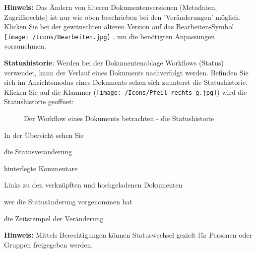 \vspace{\baselineskip}

\textbf{Hinweis:} Das Ändern von älteren Dokumentenversionen (Metadaten, Zugriffsrechte) ist nur wie oben beschrieben bei den 'Veränderungen' möglich. Klicken Sie bei der gewünschten älteren Version auf das Bearbeiten-Symbol \texttt{[image: /Icons/Bearbeiten.jpg]} , um die benötigten Anpassungen vorzunehmen.

\vspace{\baselineskip}

\textbf{Statushistorie}:
Werden bei der Dokumentenablage Workflows (Status) verwendet, kann der Verlauf eines Dokuments nachverfolgt werden. Befinden Sie sich im Ansichtsmodus eines Dokuments sehen sich zuunterst die Statushistorie. Klicken Sie auf die Klammer (\texttt{[image: /Icons/Pfeil\_rechts\_g.jpg]}) wird die Statushistorie geöffnet:

\begin{figure}[H]
\caption{Der Workflow eines Dokuments betrachten - die Statushistorie}
\end{figure}

In der Übersicht sehen Sie 

\begin{compactitem}
	\item die Statusveränderung
	\item hinterlegte Kommentare
	\item Links zu den verknüpften und hochgeladenen Dokumenten
	\item wer die Statusänderung vorgenommen hat
	\item die Zeitstempel der Veränderung
\end{compactitem}

\vspace{\baselineskip}

\textbf{Hinweis:} Mittels Berechtigungen können Statuswechsel gezielt für Personen oder Gruppen freigegeben werden.

